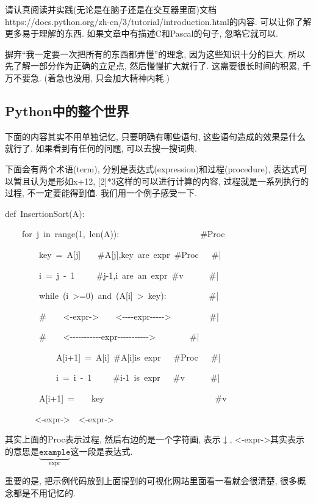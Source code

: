 请认真阅读并实践(无论是在脑子还是在交互器里面)文档https://docs.python.org/zh-cn/3/tutorial/introduction.html的内容.
可以让你了解更多易于理解的东西. 如果文章中有描述C和Pascal的句子, 忽略它就可以. 

\begin{idea}
摒弃``我一定要一次把所有的东西都弄懂''的理念, 因为这些知识十分的巨大. 所以先了解一部分作为正确的立足点, 然后慢慢扩大就行了. 这需要很长时间的积累, 千万不要急. (着急也没用, 只会加大精神内耗.)	
\end{idea}

\subsection{Python中的整个世界}

下面的内容其实不用单独记忆, 只要明确有哪些语句, 这些语句造成的效果是什么就行了. 如果看到有任何的问题, 可以去搜一搜词典. 

下面会有两个术语(term), 分别是表达式(expression)和过程(procedure), 表达式可以暂且认为是形如x+12,
{[}2{]}{*}3这样的可以进行计算的内容, 过程就是一系列执行的过程, 不一定要能得到值. 我们用一个例子感受一下.
\begin{lyxcode}
def~InsertionSort(A):~~~~~~~~~~~~~~~~~~~~~~~~~~~~

~~~~for~j~in~range(1,~len(A)):~~~~~~~~~~~~~~~~~~~\#Proc

~~~~~~~~key~=~A{[}j{]}~~~~\#A{[}j{]},key~are~expr~\#Proc~~~\#|

~~~~~~~~i~=~j~-~1~~~~~\#j-1,i~are~an~expr~\#v~~~~~~\#|

~~~~~~~~while~(i~>=0)~and~(A{[}i{]}~>~key):~~~~~~~~~~\#|~~~

~~~~~~~~\#~~~~<-expr->~~~~<-{}-{}-{}-expr-{}-{}-{}-{}->~~~~~~~~~\#|~~~

~~~~~~~~\#~~~~<-{}-{}-{}-{}-{}-{}-{}-{}-{}-{}-expr-{}-{}-{}-{}-{}-{}-{}-{}-{}-{}->~~~~~~~~\#|~~~

~~~~~~~~~~~~A{[}i+1{]}~=~A{[}i{]}~\#A{[}i{]}is~expr~~~\#Proc~~~\#|

~~~~~~~~~~~~i~=~i~-~1~~~~~\#i-1~is~expr~~~\#v~~~~~~\#|

~~~~~~~~A{[}i+1{]}~=~~~~key~~~~~~~~~~~~~~~~~~~~~~~~~~\#v

~~~~~~~<-expr->~~<-expr->
\end{lyxcode}
其实上面的Proc表示过程, 然后右边的是一个字符画, 表示$\downarrow$, <-expr->其实表示的意思是$\underbrace{\texttt{example}}_{\text{expr}}$这一段是表达式. 

重要的是, 把示例代码放到上面提到的可视化网站里面看一看就会很清楚, 很多概念都是不用记忆的. 

